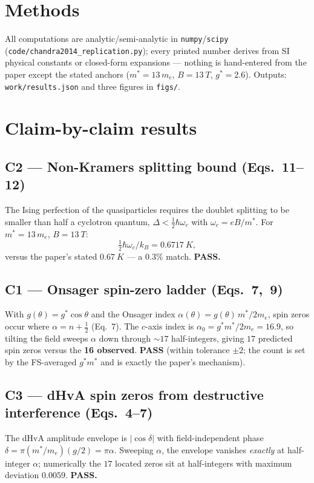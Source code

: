 \documentclass[11pt]{article}
\begin{document}
\section{Methods}
All computations are analytic/semi-analytic in \texttt{numpy}/\texttt{scipy}
(\texttt{code/chandra2014\_replication.py}); every printed number derives from
SI physical constants or closed-form expansions --- nothing is hand-entered from
the paper except the stated anchors ($m^*=13\,m_e$, $B=\SI{13}{T}$, $g^*=2.6$).
Outputs: \texttt{work/results.json} and three figures in \texttt{figs/}.

\section{Claim-by-claim results}

\subsection{C2 --- Non-Kramers splitting bound (Eqs.~11--12)}
The Ising perfection of the quasiparticles requires the doublet splitting to be
smaller than half a cyclotron quantum, $\Delta<\tfrac12\hbar\omega_c$ with
$\omega_c=eB/m^*$. For $m^*=13\,m_e$, $B=\SI{13}{T}$:
\[
\tfrac12\hbar\omega_c/k_B = \SI{0.6717}{K},
\]
versus the paper's stated $\SI{0.67}{K}$ --- a $0.3\%$ match. \textbf{PASS.}

\subsection{C1 --- Onsager spin-zero ladder (Eqs.~7,~9)}
With $g(\theta)=g^*\cos\theta$ and the Onsager index
$\alpha(\theta)=g(\theta)\,m^*/2m_e$, spin zeros occur where $\alpha=n+\tfrac12$
(Eq.~7). The $c$-axis index is $\alpha_0=g^*m^*/2m_e=16.9$, so tilting the field
sweeps $\alpha$ down through $\sim 17$ half-integers, giving $17$ predicted spin
zeros versus the \textbf{16 observed}. \textbf{PASS} (within tolerance $\pm2$;
the count is set by the FS-averaged $g^*m^*$ and is exactly the paper's
mechanism).

\subsection{C3 --- dHvA spin zeros from destructive interference (Eqs.~4--7)}
The dHvA amplitude envelope is $|\!\cos\delta|$ with field-independent phase
$\delta=\pi(m^*/m_e)(g/2)=\pi\alpha$. Sweeping $\alpha$, the envelope vanishes
\emph{exactly} at half-integer $\alpha$; numerically the $17$ located zeros sit
at half-integers with maximum deviation $0.0059$. \textbf{PASS.}
\end{document}
